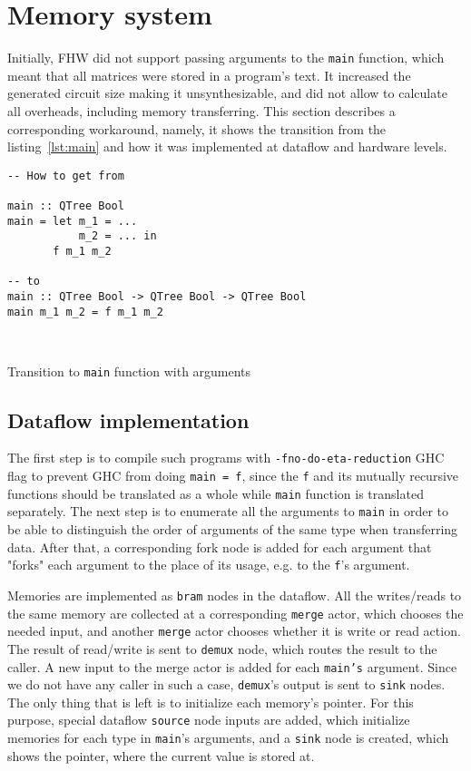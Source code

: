 \section{Memory system}

Initially, FHW did not support passing arguments to the \texttt{main} function, which meant that all matrices were stored in a program's text. It increased the generated circuit size making it unsynthesizable, and did not allow to calculate all overheads, including memory transferring. This section describes a corresponding workaround, namely, it shows the transition from the listing~\ref{lst:main} and how it was implemented at dataflow and hardware levels.

\begin{listing}[b!]
\centering
\begin{verbatim}
-- How to get from

main :: QTree Bool
main = let m_1 = ...
           m_2 = ... in
       f m_1 m_2
       
-- to
main :: QTree Bool -> QTree Bool -> QTree Bool
main m_1 m_2 = f m_1 m_2



\end{verbatim}
\caption{Transition to \texttt{main} function with arguments}
\label{lst:main}
\end{listing}

\subsection{Dataflow implementation}

The first step is to compile such programs with \texttt{-fno-do-eta-reduction} GHC flag to prevent GHC from doing \texttt{main = f}, since the \texttt{f} and its mutually recursive functions should be translated as a whole while \texttt{main} function is translated separately. The next step is to enumerate all the arguments to \texttt{main} in order to be able to distinguish the order of arguments of the same type when transferring data. After that, a corresponding fork node is added for each argument that "forks" each argument to the place of its usage, e.g. to the \texttt{f}'s argument.

Memories are implemented as \texttt{bram} nodes in the dataflow. All the writes/reads to the same memory are collected at a corresponding \texttt{merge} actor, which chooses the needed input, and another \texttt{merge} actor chooses whether it is write or read action. The result of read/write is sent to \texttt{demux} node, which routes the result to the caller. A new input to the merge actor is added for each \texttt{main's} argument. Since we do not have any caller in such a case, \texttt{demux}'s output is sent to \texttt{sink} nodes. The only thing that is left is to initialize each memory's pointer. For this purpose, special dataflow \texttt{source} node inputs are added, which initialize memories for each type in \texttt{main}'s arguments, and a \texttt{sink} node is created, which shows the pointer, where the current value is stored at.

